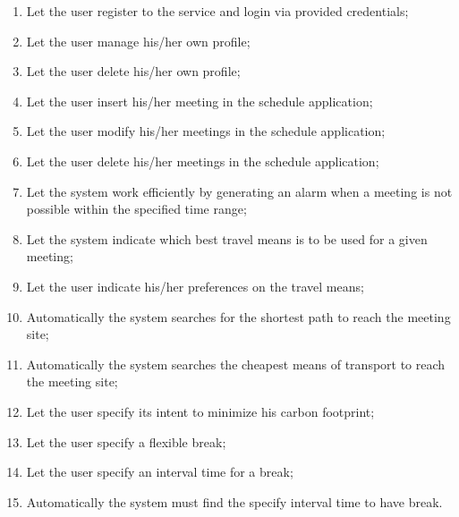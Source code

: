 \documentclass{article}
\begin{document}
	\begin{enumerate}
		\item Let the user register to the service and login via provided credentials;
		\item Let the user manage his/her own profile;
		\item Let the user delete his/her own profile;
		\item Let the user insert his/her meeting in the schedule application;
		\item Let the user modify his/her meetings in the schedule application;
		\item Let the user delete his/her meetings in the schedule application;
		\item Let the system work efficiently by generating an alarm when a meeting is not possible within the specified time range;
		\item Let the system indicate which best travel means is to be used for a given meeting;
		\item Let the user indicate his/her preferences on the travel means;
		\item Automatically the system searches for the shortest path to reach the meeting site;
		\item Automatically the system searches the cheapest means of transport to reach the meeting site;
		\item Let the user specify its intent to minimize his carbon footprint;
		\item Let the user specify a flexible break; 
		\item Let the user specify an interval time for a break;
		\item Automatically the system must find the specify interval time to have break.
	\end{enumerate}

	
\end{document}
